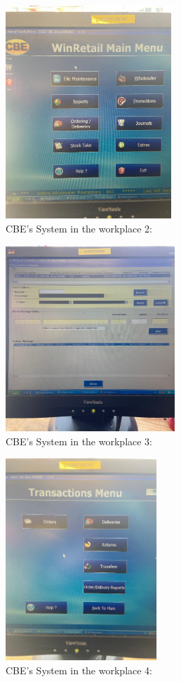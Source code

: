 \begin{figure}[h!]
	\caption{CBE's System in the workplace 2:}
	\label{image:mace2}
	\centering
	\includegraphics[width=0.56\textwidth]{images/mace2.PNG}
\end{figure}

\begin{figure}[h!]
	\caption{CBE's System in the workplace 3:}
	\label{image:mace3}
	\centering
	\includegraphics[width=0.57\textwidth]{images/mace3.PNG}
\end{figure}

\begin{figure}[h!]
	\caption{CBE's System in the workplace 4:}
	\label{image:mace4}
	\centering
	\includegraphics[width=0.51\textwidth]{images/mace4.PNG}
\end{figure}

